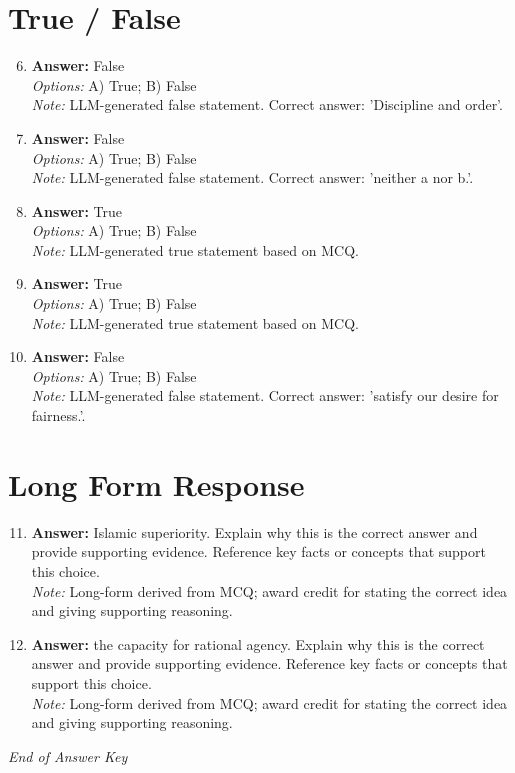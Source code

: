 \documentclass[12pt]{article}
\begin{document}
\section*{True / False}
\begin{enumerate}[label=\arabic*.]
\setcounter{enumi}{5}
\item \textbf{Answer:} False
\\ \textit{Options:} A) True; B) False
\\ \textit{Note:} LLM-generated false statement. Correct answer: 'Discipline and order'.
\item \textbf{Answer:} False
\\ \textit{Options:} A) True; B) False
\\ \textit{Note:} LLM-generated false statement. Correct answer: 'neither a nor b.'.
\item \textbf{Answer:} True
\\ \textit{Options:} A) True; B) False
\\ \textit{Note:} LLM-generated true statement based on MCQ.
\item \textbf{Answer:} True
\\ \textit{Options:} A) True; B) False
\\ \textit{Note:} LLM-generated true statement based on MCQ.
\item \textbf{Answer:} False
\\ \textit{Options:} A) True; B) False
\\ \textit{Note:} LLM-generated false statement. Correct answer: 'satisfy our desire for fairness.'.
\end{enumerate}

\section*{Long Form Response}
\begin{enumerate}[label=\arabic*.]
\setcounter{enumi}{10}
\item \textbf{Answer:} Islamic superiority. Explain why this is the correct answer and provide supporting evidence. Reference key facts or concepts that support this choice.
\\ \textit{Note:} Long-form derived from MCQ; award credit for stating the correct idea and giving supporting reasoning.
\item \textbf{Answer:} the capacity for rational agency. Explain why this is the correct answer and provide supporting evidence. Reference key facts or concepts that support this choice.
\\ \textit{Note:} Long-form derived from MCQ; award credit for stating the correct idea and giving supporting reasoning.
\end{enumerate}

\vfill
\noindent\textit{End of Answer Key}
\end{document}
